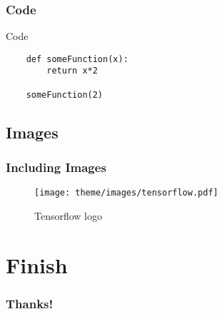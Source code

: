 \documentclass{beamer}
\begin{document}
\subsubsection{Code}
\begin{frame}[fragile=singleslide]{Code}
	\begin{lstlisting}
	def someFunction(x):
		return x*2

	someFunction(2)
	\end{lstlisting}
\end{frame}

\subsection{Images}
\begin{frame}
	\frametitle{Including Images}

	\begin{figure}
		\centering
		\texttt{[image: theme/images/tensorflow.pdf]}
		\caption{Tensorflow logo}
	\end{figure}

\end{frame}

\section{Finish}
\begin{frame}
	\frametitle{Thanks!}
\end{frame}
\end{document}
